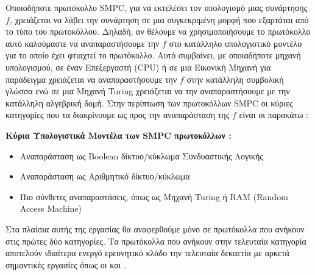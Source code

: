 Οποιοδήποτε πρωτόκολλο SMPC, για να εκτελέσει τον υπολογισμό μιας συνάρτησης $f$, χρειάζεται να λάβει την συνάρτηση σε μια συγκεκριμένη μορφή που εξαρτάται από το τύπο του πρωτοκόλλου. Δηλαδή, αν θέλουμε να χρησιμοποιήσουμε το πρωτόκολλο αυτό καλούμαστε να αναπαραστήσουμε την $f$ στο κατάλληλο υπολογιστικό μοντέλο για το οποίο έχει φτιαχτεί το πρωτόκολλο. Αυτό συμβαίνει, με οποιαδήποτε μηχανή υπολογισμού, σε έναν Επεξεργαστή (CPU) ή σε μια Εικονική Μηχανή για παράδειγμα χρειάζεται να αναπαραστήσουμε την $f$ στην κατάλληλη συμβολική γλώσσα ενώ σε μια Μηχανή Turing χρειάζεται να την αναπαραστήσουμε με την κατάλληλη αλγεβρική δομή. Στην περίπτωση των πρωτοκόλλων SMPC οι κύριες κατηγορίες που τα διακρίνουμε ως προς την αναπαράσταση της $f$ είναι οι παρακάτω :

\begin{definition}
\textbf{Κύρια Υπολογιστικά Μοντέλα των SMPC πρωτοκόλλων :}
\begin{itemize}
    \item Αναπαράσταση ως Boolean δίκτυο/κύκλωμα Συνδυαστικής Λογικής
    \item Αναπαράσταση ως Αριθμητικό δίκτυο/κύκλωμα
    \item Πιο σύνθετες αναπαραστάσεις, όπως ως Μηχανή Turing ή RAM (Random Access Machine)
\end{itemize}
\end{definition}

Στα πλαίσια αυτής της εργασίας θα αναφερθούμε μόνο σε πρωτόκολλα που ανήκουν στις πρώτες δύο κατηγορίες. Τα πρωτόκολλα που ανήκουν στην τελευταία κατηγορία αποτελούν ιδιαίτερα ενεργό ερευνητικό κλάδο την τελευταία δεκαετία με αρκετά σημαντικές εργασίες όπως οι \cite{cryptoeprint:2014/082} και \cite{goldwasser2013run}.

